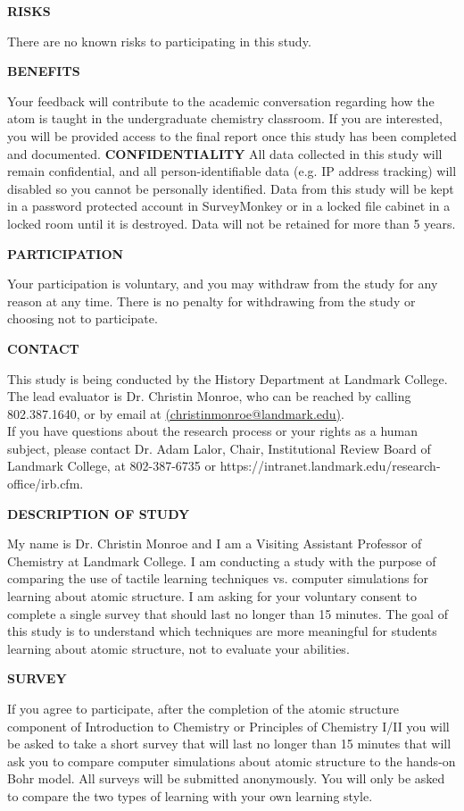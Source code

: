 \documentclass[11pt]{sig-alternate}
\begin{document}
\begin{large}
\textbf{RISKS}

There are no known risks to participating in this study.

\textbf{BENEFITS}

Your feedback will contribute to the academic conversation regarding how the atom is taught in the undergraduate chemistry classroom.  If you are interested, you will be provided access to the final report once this study has been completed and documented. 
\textbf{CONFIDENTIALITY}
All data collected in this study will remain confidential, and all person-identifiable data (e.g. IP address tracking) will disabled so you cannot be personally identified. Data from this study will be kept in a password protected account in SurveyMonkey or in a locked file cabinet in a locked room until it is destroyed. Data will not be retained for more than 5 years.

\textbf{PARTICIPATION}

Your participation is voluntary, and you may withdraw from the study for any reason at any time. There is no penalty for withdrawing from the study or choosing not to participate. 

\textbf{CONTACT}

This study is being conducted by the History Department at Landmark College. The lead evaluator is Dr. Christin Monroe, who can be reached by calling 802.387.1640, or by email at \href{mailto:csupalo@ets.org}{(christinmonroe@landmark.edu)}.\\

If you have questions about the research process or your rights as a human subject, please contact Dr. Adam Lalor, Chair, Institutional Review Board of Landmark College, at 802-387-6735 or https://intranet.landmark.edu/research-office/irb.cfm.

\textbf{DESCRIPTION OF STUDY}

My name is Dr. Christin Monroe and I am a Visiting Assistant Professor of Chemistry at Landmark College.  I am conducting a study with the purpose of comparing the use of tactile learning techniques vs. computer simulations for learning about atomic structure.  I am asking for your voluntary consent to complete a single survey that should last no longer than 15 minutes.  The goal of this study is to understand which techniques are more meaningful for students learning about atomic structure, not to evaluate your abilities.

\textbf{SURVEY}

If you agree to participate, after the completion of the atomic structure component of Introduction to Chemistry or Principles of Chemistry I/II you will be asked to take a short survey that will last no longer than 15 minutes that will ask you to compare computer simulations about atomic structure to the hands-on Bohr model.  All surveys will be submitted anonymously.  You will only be asked to compare the two types of learning with your own learning style.


\end{large}
\end{document}
